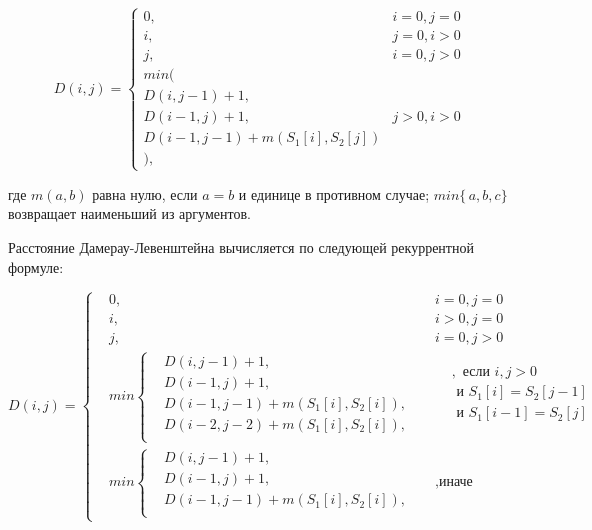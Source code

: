 \documentclass[12pt]{report}
\begin{document}
\begin{displaymath}
	D(i,j) = \left\{ \begin{array}{ll}
	0, & \textrm{$i = 0, j = 0$}\\
	i, & \textrm{$j = 0, i > 0$}\\
	j, & \textrm{$i = 0, j > 0$}\\
	min(\\
	D(i,j-1)+1,\\
	D(i-1, j) +1, &\textrm{$j>0, i>0$}\\
	D(i-1, j-1) + m(S_{1}[i], S_{2}[j])\\
	),
	\end{array} \right.
\end{displaymath}

где $m(a,b)$ равна нулю, если $a=b$ и единице в противном случае; $min\{\,a,b,c\}$ возвращает наименьший из аргументов.

Расстояние Дамерау-Левенштейна вычисляется по следующей рекуррентной формуле:
		    
\[ D(i, j) =  \left\{
	\begin{aligned}
		  & 0, &   & i = 0, j = 0 \\
		  & i, &   & i > 0, j = 0 \\
		  & j, &   & i = 0, j > 0 \\		    	
		&min \left\{
		\begin{aligned}
		&D(i, j - 1) + 1,\\
		&D(i - 1, j) + 1,\\
		&D(i - 1, j - 1) + m(S_{1}[i], S_{2}[i]), \\
		&D(i - 2, j - 2) + m(S_{1}[i], S_{2}[i]),\\
	\end{aligned} \right.
	&& 
	\begin{aligned}
		  & , \text{ если } i, j > 0         \\
		  & \text{ и } S_{1}[i] = S_{2}[j - 1]  \\
		  & \text{ и } S_{1}[i - 1] =  S_{2}[j] \\
	\end{aligned} \\ 
	&min \left\{
	\begin{aligned}
		  & D(i, j - 1) + 1,                         \\
		  & D(i - 1, j) + 1,                         \\
		  & D(i - 1, j - 1) + m(S_{1}[i], S_{2}[i]), \\
	\end{aligned} \right.  &&, \text{иначе}
	\end{aligned} \right.
\]	
	    
\end{document}

